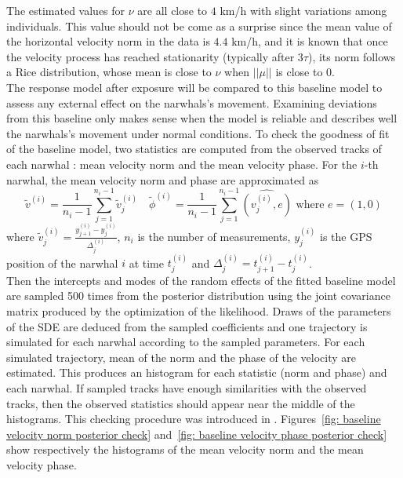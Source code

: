 \documentclass[11pt]{article}
\newcommand {\1}{\mathbb{1}}
\begin{document}
The estimated values for $\nu$ are all close to $4$ km/h with slight variations among individuals. This value should not be come as a surprise since the mean value of the horizontal velocity norm in the data is $4.4$ km/h, and it is known  that once the velocity process has reached stationarity (typically after $3\tau$), its norm follows a Rice distribution, whose mean is close to $\nu$ when $\vert\vert\mu\vert \vert$ is 
close to $0$.\\

The response model after exposure will be compared to this baseline model to assess any external effect on the narwhals's movement. Examining deviations from this baseline only makes sense when the model is reliable and describes well the narwhals's movement under normal conditions.
To check the goodness of fit of the baseline model, two statistics are computed from the observed tracks of each narwhal : mean velocity norm and the mean velocity phase. For the $i$-th narwhal, the mean velocity norm and phase are approximated as
\[\tilde{v}^{(i)}=\frac{1}{n_i-1}\sum_{j=1}^{n_i-1}  \tilde{v}^{(i)}_j \quad \tilde{\phi}^{(i)}=\frac{1}{n_i-1} \sum_{j=1}^{n_i-1} \widehat{(v_j^{(i)},e)} \mbox{ where } e=(1,0)\]
where $\tilde{v}^{(i)}_j=\frac{y_{j+1}^{(i)}-y^{(i)}_j}{\Delta^{(i)}_j}$, $n_i$ is the number of measurements, $y^{(i)}_j$ is the GPS position of the narwhal $i$ at time $t_j^{(i)}$ and $\Delta^{(i)}_j=t^{(i)}_{j+1}-t^{(i)}_j$.\\
Then the intercepts and modes of the random effects of the fitted baseline model are sampled 500 times from the posterior distribution using the joint covariance matrix produced by the optimization of the likelihood. Draws of the parameters of the SDE are deduced from the sampled coefficients and one trajectory is simulated for each narwhal according to the sampled parameters. For each simulated trajectory, mean of the norm and the phase of the velocity are estimated. This produces an histogram for each statistic (norm and phase) and each narwhal. If sampled tracks have enough similarities with the observed tracks, then the observed statistics should appear near the middle of the histograms. This checking procedure was introduced in \cite{michelot_continuous-time_2022}. Figures~\ref{fig: baseline velocity norm posterior check} and~\ref{fig: baseline velocity phase posterior check} show respectively the histograms of the mean velocity norm and the mean velocity phase.
\end{document}
